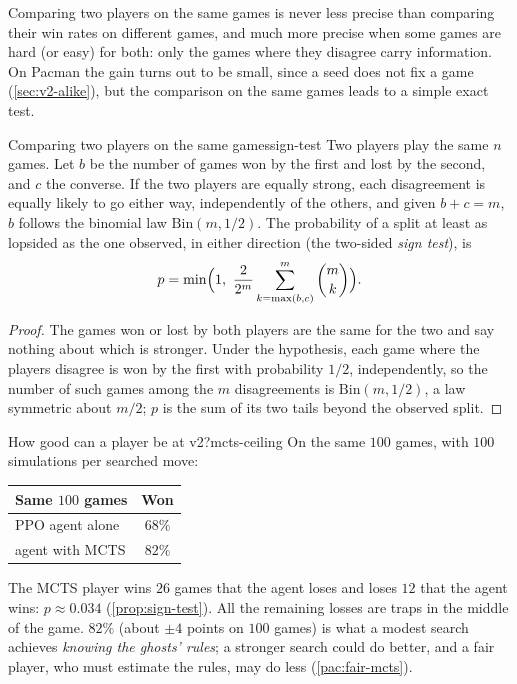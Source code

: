 Comparing two players on the same games is never less precise than
comparing their win rates on different games, and much more precise when
some games are hard (or easy) for both: only the games where they disagree
carry information. On Pacman the gain turns out to be small, since a seed
does not fix a game (\cref{sec:v2-alike}), but the comparison on the same
games leads to a simple exact test.

\begin{proposition}{Comparing two players on the same games}{sign-test}
  Two players play the same $n$ games. Let $b$ be the number of games won
  by the first and lost by the second, and $c$ the converse. If the two
  players are equally strong, each disagreement is equally likely to go
  either way, independently of the others, and given $b + c = m$, $b$
  follows the binomial law $\mathrm{Bin}(m, 1/2)$. The probability of a
  split at least as lopsided as the one observed, in either direction
  (the two-sided \emph{sign test}), is
  \begin{equation}
    p = \min\Bigl(1,\ \frac{2}{2^m} \sum_{k = \max(b, c)}^{m}
    \binom{m}{k}\Bigr).
  \end{equation}
\end{proposition}

\begin{proof}
  The games won or lost by both players are the same for the two and say
  nothing about which is stronger. Under the hypothesis, each game where
  the players disagree is won by the first with probability $1/2$,
  independently, so the number of such games among the $m$ disagreements
  is $\mathrm{Bin}(m, 1/2)$, a law symmetric about $m/2$; $p$ is the sum of
  its two tails beyond the observed split.
\end{proof}

\begin{pacman}{How good can a player be at v2?}{mcts-ceiling}
  On the same $100$ games, with $100$ simulations per searched move:
  \begin{center}
    \begin{tabular}{@{}lc@{}}
      \toprule
      Same $100$ games & Won \\
      \midrule
      PPO agent alone & $68\%$ \\
      agent with MCTS & $82\%$ \\
      \bottomrule
    \end{tabular}
  \end{center}
  The MCTS player wins $26$ games that the agent loses and loses $12$ that
  the agent wins: $p \approx 0.034$ (\cref{prop:sign-test}). All the
  remaining losses are traps in the middle of the game. $82\%$ (about
  $\pm 4$ points on $100$ games) is what a modest search achieves
  \emph{knowing the ghosts' rules}; a stronger search could do better, and
  a fair player, who must estimate the rules, may do less
  (\cref{pac:fair-mcts}).
\end{pacman}

